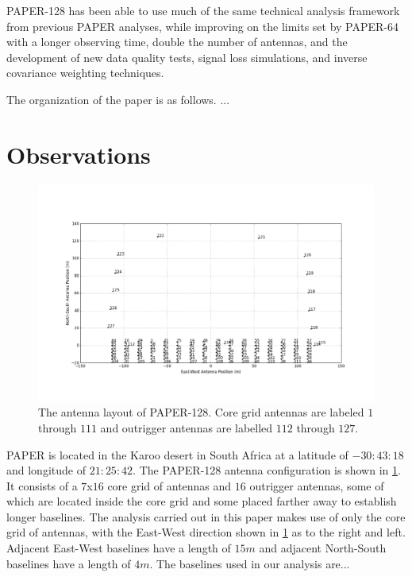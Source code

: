 \documentclass[preprint2,numberedappendix,tighten,twocolappendix]{aastex6}  %
\begin{document}
PAPER-128 has been able to use much of the same technical analysis framework from previous PAPER analyses, while improving on the limits set by PAPER-64 with a longer observing time, double the number of antennas, and the development of new data quality tests, signal loss simulations, and inverse covariance weighting techniques. 

The organization of the paper is as follows. ...

\section{Observations}
\label{sec:Obs}

\begin{figure}[!]
	\centering
	\includegraphics[width=1.0\textwidth]{antlayout.png}
	\caption{The antenna layout of PAPER-128. Core grid antennas are labeled $1$ through $111$ and outrigger antennas are labelled $112$ through $127$.}
	\label{fig:layout}
\end{figure}

PAPER is located in the Karoo desert in South Africa at a latitude of $-30:43:18$ and longitude of $21:25:42$. The PAPER-128 antenna configuration is shown in \ref{fig:layout}. It consists of a $7$x$16$ core grid of antennas and $16$ outrigger antennas, some of which are located inside the core grid and some placed farther away to establish longer baselines. The analysis carried out in this paper makes use of only the core grid of antennas, with the East-West direction shown in \ref{fig:layout} as to the right and left. Adjacent East-West baselines have a length of $15 m$ and adjacent North-South baselines have a length of $4 m$. The baselines used in our analysis are...
\end{document}
